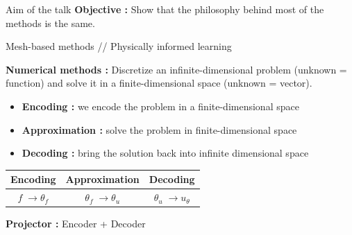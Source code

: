 \begin{frame}{Aim of the talk}
	\textbf{Objective :} Show that the philosophy behind most of the methods is the same.
	\begin{center}
		Mesh-based methods \hspace{5pt} // \hspace{5pt} Physically informed learning
	\end{center}
	
	\textbf{Numerical methods :} Discretize an infinite-dimensional problem (unknown = function) and solve it in a finite-dimensional space (unknown = vector).
	\begin{itemize}[\textbullet]
		\item \textbf{Encoding :} we encode the problem in a finite-dimensional space
		\item \textbf{Approximation :} solve the problem in finite-dimensional space
		\item \textbf{Decoding :} bring the solution back into infinite dimensional space
	\end{itemize}
	
	\begin{center}
		\begin{tabular}{|c|c|c|}
			\hline
			\textbf{Encoding} & \textbf{Approximation} & \textbf{Decoding} \\
			\hline
			$f \; \rightarrow \theta_f$ & $\theta_f \; \rightarrow \theta_u$ & $\theta_u \; \rightarrow u_\theta$ \\
			\hline
		\end{tabular}
	\end{center}

	\bigskip

	\textbf{Projector :} Encoder + Decoder
	\begin{figure}[htb]
		\vspace{-10pt}
	\end{figure}
\end{frame}
